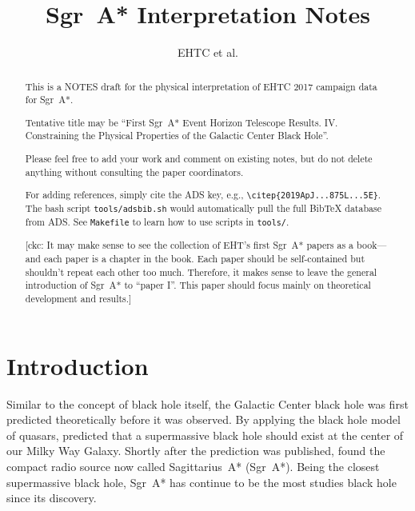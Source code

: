 \documentclass[twocolumn,tighten,dvipsnames]{aastex63}
\newcommand\sgra{Sgr~A*\xspace}
\newcommand\<{{\langle}}
\renewcommand\>{{\rangle}} %
\newcommand\ckc[1]{{\color{MidnightBlue}[ckc: #1]}}
\begin{document}
\title{\sgra Interpretation Notes}
\author{EHTC et al.}

\shorttitle{\sgra Interpretation}

\revised{\today}

\begin{abstract}
  \color{BrickRed}

  This is a NOTES draft for the physical interpretation of EHTC 2017
  campaign data for \sgra.

  Tentative title may be ``First \sgra Event Horizon Telescope
  Results. IV. Constraining the Physical Properties of the Galactic
  Center Black Hole''.

  Please feel free to add your work and comment on existing notes, but
  do not delete anything without consulting the paper coordinators.

  For adding references, simply cite the ADS key, e.g.,
  \texttt{\textbackslash citep\{2019ApJ...875L...5E\}}.
  The bash script \texttt{tools/adsbib.sh} would automatically pull
  the full BibTeX database from ADS.
  See \texttt{Makefile} to learn how to use scripts in
  \texttt{tools/}.

  \ckc{It may make sense to see the collection of EHT's first \sgra
    papers as a book---and each paper is a chapter in the book.
    Each paper should be self-contained but shouldn't repeat each
    other too much.
    Therefore, it makes sense to leave the general introduction of
    \sgra to ``paper I''.
    This paper should focus mainly on theoretical development and
    results.}
\end{abstract}


\section{Introduction}
\label{sec:intro}

Similar to the concept of black hole itself, the Galactic Center black
hole was first predicted theoretically before it was observed.
By applying the black hole model of quasars,
\citet{1971MNRAS.152..461L} predicted that a supermassive black hole
should exist at the center of our Milky Way Galaxy.
Shortly after the prediction was published,
\citet{1974ApJ...194..265B, 1975A&A....43..159E, 1975ApJ...202L..63L}
found the compact radio source now called Sagittarius~A* (\sgra).
Being the closest supermassive black hole, \sgra has continue to be
the most studies black hole since its discovery.
\end{document}
